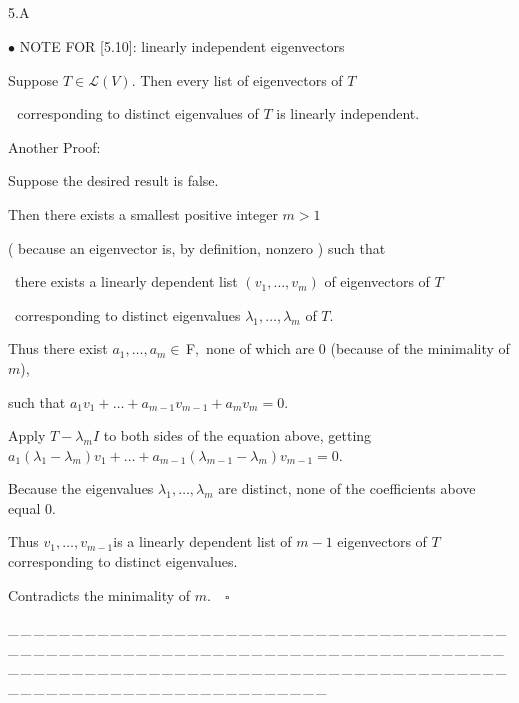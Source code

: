 \documentclass[a4paper, 11pt, UTF8]{article}
\def\Lm{\mathcal{L}}
\def\Fbfc{$\,{\timesbf F}$}
\begin{document}
\begin{large}
\par{\tiny\,\par}{\,\par}{\,\par}{\tiny\,\par}

{\huge\timesbf 5.A} %

{\small $\bullet$} {\timesbf\Large N{\normalsize OTE} F{\normalsize OR} [5.10]:} {\Large\timessl linearly independent eigenvectors}\par\quad
{\Large\timessl Suppose $T\in\Lm(V).$ Then every list of eigenvectors of $T$\par\qquad\qquad\qquad\qquad\qquad\quad\,\,
corresponding to distinct eigenvalues of $T$ is linearly independent.}\par
{\timessl\Large Another Proof:}\par\quad
Suppose the desired result is false.\par\quad
Then there exists a smallest positive integer $m>1$\par\quad
( because an eigenvector is, by definition, nonzero ) such that\par\qquad\quad\,
there exists a linearly dependent list $(v_1,\dots,v_m)$ of eigenvectors of $T$\par\qquad\quad\,
corresponding to distinct eigenvalues $\lambda_1,\dots,\lambda_m$ of $T.$\par\quad
Thus there exist $a_1,\dots,a_m\in\Fbfc,$ none of which are $0$ (because of the minimality of $m$),\par\quad
such that $a_1 v_1+\dots+a_{m-1}v_{m-1}+a_m v_m=0.$\par\quad
Apply $T - \lambda_m I$ to both sides of the equation above, getting $a_1 (\lambda_1 - \lambda_m )v_1 + \dots + a_{m-1}(\lambda_{m-1} - \lambda_m )v_{m-1} = 0.$\par\quad
Because the eigenvalues $\lambda_1,\dots,\lambda_m$ are distinct, none of the coefficients above equal $0$.\par\quad
Thus $v_1 ,\dots, v_{m-1}$is a linearly dependent list of $m - 1$ eigenvectors of $T$ corresponding to distinct eigenvalues.\par\quad
Contradicts the minimality of $m.\quad\square$\par
{\tiny \_\,\_\,\_\,\_\,\_\,\_\,\_\,\_\,\_\,\_\,\_\,\_\,\_\,\_\,\_\,\_\,\_\,\_\,\_\,\_\,\_\,\_\,\_\,\_\,\_\,\_\,\_\,\_\,\_\,\_\,\_\,\_\,\_\,\_\,\_\,\_\,\_\,\_\,\_\,\_\,\_\,\_\,\_\,\_\,\_\,\_\,\_\,\_\,\_\,\_\,\_\,\_\,\_\,\_\,\_\,\_\,\_\,\_\,\_\,\_\,\_\,\_\,\_\,\_\,\_\,\_\,\_\,\_\,\_\,\_\,\_\_\,\_\,\_\,\_\,\_\,\_\,\_\,\_\,\_\,\_\,\_\,\_\,\_\,\_\,\_\,\_\,\_\,\_\,\_\,\_\,\_\,\_\,\_\,\_\,\_\,\_\,\_\,\_\,\_\,\_\,\_\,\_\,\_\,\_\,\_\,\_\,\_\,\_\,\_\,\_\,\_\,\_\,\_\,\_\,\_\,\_\,\_\,\_\,\_\,\_\,\_\,\_\,\_\,\_\,\_\,\_\,\_\,\_\,\_\,\_\,\_\,\_\,\_\,\_\,\_\,\_\,\_\,\_\,\_\,\_\,\_}\par


\end{large}
\end{document}
